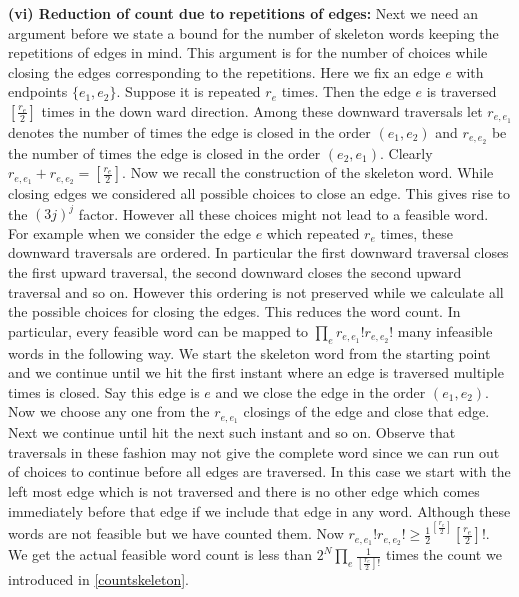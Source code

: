 \documentclass[12pt]{article}
\numberwithin{equation}{section}
\numberwithin{equation}{section}
\theoremstyle{definition}
\renewcommand{\1}{\bf 1}
\begin{document}
\textbf{(vi) Reduction of count due to repetitions of edges:}
Next we need an argument before we state a bound for the number of skeleton words keeping the repetitions of edges in mind. This argument is for the number of choices while closing the edges corresponding to the repetitions. Here we fix an edge $e$ with endpoints $\{ e_{1}, e_{2} \}$. Suppose it is repeated $r_{e}$ times. Then the edge $e$ is traversed $\left[\frac{r_{e}}{2}\right]$ times in the down ward direction. Among these downward traversals let $r_{e,e_{1}}$ denotes the number of times the edge is closed in the order $(e_{1},e_{2})$ and $r_{e,e_{2}}$ be the number of times the edge is closed in the order $(e_{2},e_{1})$. Clearly $r_{e,e_{1}}+ r_{e,e_{2}}= \left[\frac{r_{e}}{2}\right]$. Now we recall the construction of the skeleton word. While closing edges we considered all possible choices to close an edge. This gives rise to the $(3j)^{j}$ factor. However all these choices might not lead to a feasible word. For example when we consider the edge $e$ which repeated $r_{e}$ times, these downward traversals are ordered. In particular the first downward traversal closes the first upward traversal, the second downward closes the second upward traversal and so on. However this ordering is not preserved while we calculate all the possible choices for closing the edges. This reduces the word count. In particular, every feasible word can be mapped to $\prod_{e} r_{e,e_{1}}! r_{e,e_{2}}!$ many infeasible words in the following way. We start the skeleton word from the starting point and we continue until we hit the first instant where an edge is traversed multiple times is closed. Say this edge is $e$ and we close the edge in the order $(e_{1},e_{2})$. Now we choose any one from the $r_{e,e_{1}}$ closings of the edge and close that edge. Next we continue until hit the next such instant and so on. Observe that traversals in these fashion may not give the complete word since we can run out of choices to continue before all edges are traversed. In this case we start with the left most edge which is not traversed and there is no other edge which comes immediately before that edge if we include that edge in any word. Although these words are not feasible but we have counted them. Now $r_{e,e_{1}}! r_{e,e_{2}}! \ge \frac{1}{2}^{\left[\frac{r_{e}}{2}\right]} \left[\frac{r_{e}}{2}\right]!$. We get the actual feasible word count is less than $2^{N} \prod_{e} \frac{1}{\left[\frac{r_{e}}{2}\right]!}$ times the count we introduced in \eqref{countskeleton}.  
\end{document}
